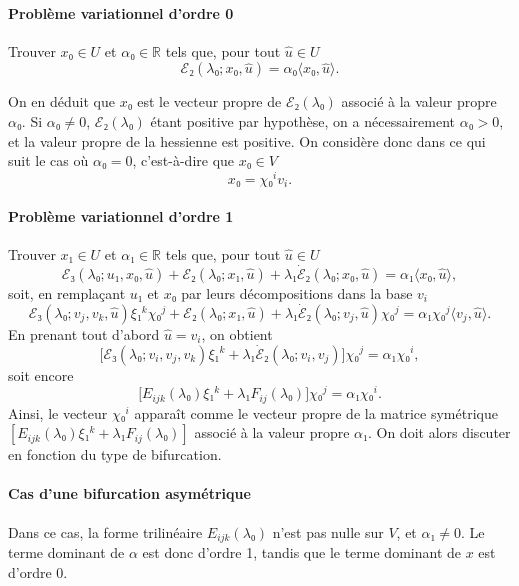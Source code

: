 \documentclass[12pt, final]{scrartcl}
\theoremstyle{definition}
\newcommand{\reals}{\mathbb{R}}
\begin{document}
\paragraph{Problème variationnel d'ordre 0} Trouver \(x₀∈U\) et \(α₀∈\reals\)
tels que, pour tout \(\hat{u}∈U\)
\begin{equation}
  ℰ₂(λ₀; x₀, \hat{u}) = α₀ 〈 x₀, \hat{u} 〉.
\end{equation}

On en déduit que \(x₀\) est le vecteur propre de \(ℰ₂(λ₀)\) associé à la valeur
propre \(α₀\). Si \(α₀ \neq 0\), \(ℰ₂ (λ₀)\) étant positive par hypothèse, on a
nécessairement \(α₀ > 0\), et la valeur propre de la hessienne est positive. On
considère donc dans ce qui suit le cas où \(α₀ = 0\), c'est-à-dire que \(x₀∈V\)
\begin{equation}
  x₀ = χ₀^i v_i.
\end{equation}

\paragraph{Problème variationnel d'ordre 1} Trouver \(x₁∈U\) et \(α₁∈\reals\)
tels que, pour tout \(\hat{u}∈U\)
\begin{equation}
  ℰ₃(λ₀; u₁, x₀, \hat{u}) + ℰ₂(λ₀ ; x₁, \hat{u}) + λ₁ \dot{ℰ}₂(λ₀; x₀, \hat{u}) = α₁ 〈 x₀, \hat{u} 〉,
\end{equation}
soit, en remplaçant \(u₁\) et \(x₀\) par leurs décompositions dans la base \(v_i\)
\begin{equation}
  ℰ₃(λ₀; v_j, v_k, \hat{u}) ξ₁^k χ₀^j + ℰ₂(λ₀; x₁, \hat{u}) + λ₁ \dot{ℰ}₂(λ₀; v_j, \hat{u}) χ₀^j = α₁ χ₀^j 〈 v_j, \hat{u} 〉.
\end{equation}
En prenant tout d'abord \(\hat{u} = v_i\), on obtient
\begin{equation}
  \bigl[ℰ₃(λ₀; v_i, v_j, v_k) ξ₁^k + λ₁ \dot{ℰ}₂(λ₀; v_i, v_j)\bigr] χ₀^j = α₁ χ₀^i,
\end{equation}
soit encore
\begin{equation}
  \bigl[E_{i j k}(λ₀) ξ₁^k + λ₁ F_{i j}(λ₀)\bigr] χ₀^j = α₁ χ₀^i.
\end{equation}
Ainsi, le vecteur \(χ₀^i\) apparaît comme le vecteur propre de la matrice
symétrique \([E_{i j k}(λ₀) ξ₁^k + λ₁ F_{i j}(λ₀)]\) associé à la valeur propre
\(α₁\). On doit alors discuter en fonction du type de bifurcation.

\paragraph{Cas d'une bifurcation asymétrique} Dans ce cas, la forme trilinéaire
\(E_{i j k}(λ₀)\) n'est pas nulle sur \(V\), et \(α₁ \neq 0\). Le terme dominant
de \(α\) est donc d'ordre 1, tandis que le terme dominant de \(x\) est d'ordre
0.
\end{document}
